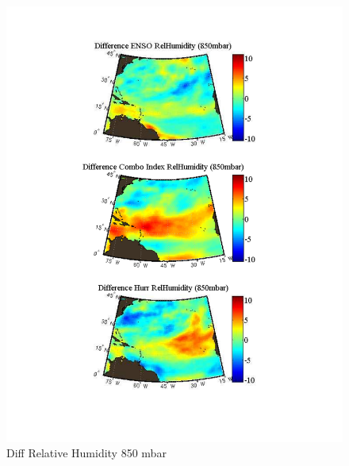 \documentclass[]{article}
\begin{document}
\begin{figure}[ht]
\begin{minipage}[b]{0.55\linewidth}
\includegraphics[width=\textwidth]{figures/comboIndex/composites/compareMDRCompositesRelativeHumidity.pdf}
\caption{Diff Relative Humidity 850 mbar}
\label{fig:figure21}
\end{minipage}
\hspace{0cm}
\begin{minipage}[b]{0.55\linewidth}

\end{minipage}
\end{figure}
\end{document}
